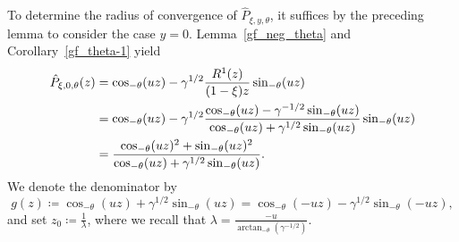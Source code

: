 \documentclass[10pt,a4paper]{amsart}
\newcommand{\1}{\mathds{1}}
\begin{document}
To determine the radius of convergence of $\hat{P}_{\xi,y,\theta}$, it suffices by the preceding lemma to consider the case $y=0$.  Lemma~\ref{gf_neg_theta} and Corollary~\ref{gf_theta-1} yield  
     \begin{align}\label{quotient_hat_P_thetaneg}
      \hat{P}_{\xi,0,\theta}(z)&=  
      \cos_{-\theta}(uz)
     -\gamma^{1/2}\frac{R^1(z)}{(1-\xi) z}\sin_{-\theta}(uz)\notag
     \\&=\cos_{-\theta}(uz)
     -\gamma^{1/2}\frac{\cos_{-\theta}(uz)-\gamma^{-1/2}\sin_{-\theta}(uz)}{\cos_{-\theta}(uz)+\gamma^{1/2}\sin_{-\theta}(uz)}\sin_{-\theta}(uz)\notag
     \\&=\frac{\cos_{-\theta}(uz)^2+\sin_{-\theta}(uz)^2}{\cos_{-\theta}(uz)+\gamma^{1/2}\sin_{-\theta}(uz)}.
    \end{align}
We denote the denominator by $$g(z)\coloneqq\cos_{-\theta}(uz)+\gamma^{1/2}\sin_{-\theta}(uz)=\cos_{-\theta}(-uz)-\gamma^{1/2}\sin_{-\theta}(-uz),$$
and set $z_0\coloneqq\frac{1}{\lambda}$, where we recall that $\lambda=\frac{-u}{\arctan_{-\theta}\left(\gamma^{-1/2}\right)}$.
\end{document}
